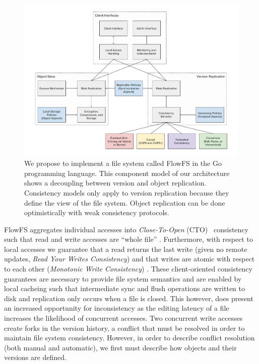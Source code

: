 \documentclass{article}
\begin{document}
\begin{figure}
    \centering
        \includegraphics[width=\textwidth]{figures/architecture}
        \caption[Component architecture of FlowFS, our proposed file system.]{We propose to implement a file system called FlowFS in the Go programming language. This component model of our architecture shows a decoupling between version and object replication. Consistency models only apply to version replication because they define the view of the file system. Object replication can be done optimistically with weak consistency protocols.}
        \label{fig:architecture}
\end{figure}

FlowFS aggregates individual accesses into \textit{Close-To-Open} (CTO)~\cite{afs,codaWeak,mashtizadeh_replication_2013,li_secure_2004,globalfs} consistency such that read and write accesses are ``whole file'' \cite{muthitacharoen_low-bandwidth_2001}. Furthermore, with respect to local accesses we guarantee that a read returns the last write (given no remote updates, \textit{Read Your Writes Consistency}) and that writes are atomic with respect to each other (\textit{Monotonic Write Consistency}) \cite{bermbach_consistency_2013}. These client-oriented consistency guarantees are necessary to provide file system semantics and are enabled by local cacheing such that intermediate sync and flush operations are written to disk and replication only occurs when a file is closed. This however, does present an increased opportunity for inconsistency as the editing latency of a file increases the likelihood of concurrent accesses. Two concurrent write accesses create forks in the version history, a conflict that must be resolved in order to maintain file system consistency. However, in order to describe conflict resolution (both manual and automatic), we first must describe how objects and their versions are defined.
\end{document}
